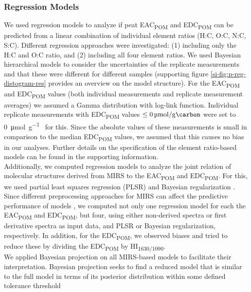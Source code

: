 \documentclass[draft,linenumbers]{agujournal2018}
\begin{document}
\subsubsection{Regression Models}

We used regression models to analyze if peat EAC\textsubscript{POM} and
EDC\textsubscript{POM} can be predicted from a linear combination of
individual element ratios (H:C, O:C, N:C, S:C). Different regression
approaches were investigated: (1) including only the H:C and O:C ratio,
and (2) including all four element ratios. We used Bayesian hierarchical
models to consider the uncertainties of the replicate measurements and
that these were different for different samples (supporting figure
\ref{si-fig:p-reg-distogram-res} provides an overview on the model
structure). For the EAC\textsubscript{POM} and EDC\textsubscript{POM}
values (both individual measurements and replicate measurement averages)
we assumed a Gamma distribution with log-link function. Individual
replicate measurements with EDC\textsubscript{POM} values
\(\le \SI{0}{\micro\mol\per\gram\carbon}\) were set to
\SI{0}{\micro\mol\per\gram\carbon} for this. Since the absolute values
of these measurements is small in comparison to the median
EDC\textsubscript{POM} values, we assumed that this causes no bias in
our analyses. Further details on the specification of the element
ratio-based models can be found in the supporting information.\\
Additionally, we computed regression models to analyze the joint
relation of molecular structures derived from MIRS to the
EAC\textsubscript{POM} and EDC\textsubscript{POM}. For this, we used
partial least squares regression (PLSR) and Bayesian regularization
\citep[e.g.~][]{Artz.2008, Ferragina.2015}. Since different
preprocessing approaches for MIRS can affect the predictive performance
of models \citep{Engel.2013}, we computed not only one regression model
for each the EAC\textsubscript{POM} and EDC\textsubscript{POM}, but
four, using either non-derived spectra or first derivative spectra as
input data, and PLSR or Bayesian regularization, respectively. In
addition, for the EDC\textsubscript{POM}, we observed biases and tried
to reduce these by dividing the EDC\textsubscript{POM} by
HI\textsubscript{1630/1090}.\\
We applied Bayesian projection \citep{Piironen.2020} on all MIRS-based
models to facilitate their interpretation. Bayesian projection seeks to
find a reduced model that is similar to the full model in terms of its
posterior distribution within some defined tolerance threshold
\end{document}
